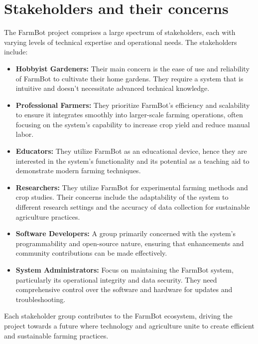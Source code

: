 \section{Stakeholders and their concerns}
The FarmBot project comprises a large spectrum of stakeholders, each with varying levels of technical expertise and operational needs. The stakeholders include:
\begin{itemize}
    \item \textbf{Hobbyist Gardeners:} Their main concern is the ease of use and reliability of FarmBot to cultivate their home gardens. They require a system that is intuitive and doesn't necessitate advanced technical knowledge.
    \item \textbf{Professional Farmers:} They prioritize FarmBot's efficiency and scalability to ensure it integrates smoothly into larger-scale farming operations, often focusing on the system's capability to increase crop yield and reduce manual labor.
    \item \textbf{Educators:} They utilize FarmBot as an educational device, hence they are interested in the system's functionality and its potential as a teaching aid to demonstrate modern farming techniques.
    \item \textbf{Researchers:} They utilize FarmBot for experimental farming methods and crop studies. Their concerns include the adaptability of the system to different research settings and the accuracy of data collection for sustainable agriculture practices.
    \item \textbf{Software Developers:} A group primarily concerned with the system's programmability and open-source nature, ensuring that enhancements and community contributions can be made effectively.
    \item \textbf{System Administrators:} Focus on maintaining the FarmBot system, particularly its operational integrity and data security. They need comprehensive control over the software and hardware for updates and troubleshooting.
\end{itemize}
Each stakeholder group contributes to the FarmBot ecosystem, driving the project towards a future where technology and agriculture unite to create efficient and sustainable farming practices.
